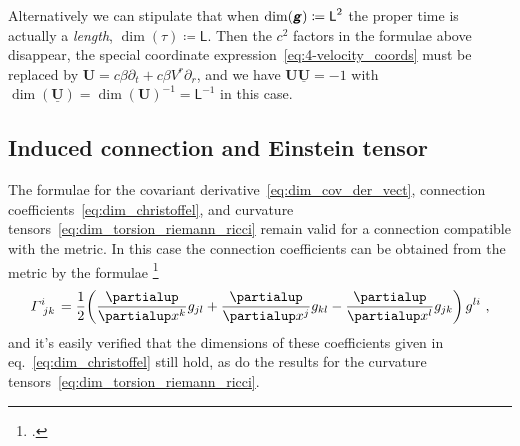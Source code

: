 \documentclass[\ifafour a4paper,12pt,\else a5paper,10pt,\fi%
onecolumn,oneside,article,%
british%
]{memoir}
\theoremstyle{remark}
\theoremstyle{innote}
\newcommand*{\mathte}[1]{\textbf{\textit{\textsf{#1}}}}
\newcommand*{\citep}{\footcites}
\newcommand*{\de}{\partialup}%
\newcommand*{\defd}{\coloneqq}
\renewcommand*{\|}[1][]{\nonscript\,#1\vert\nonscript\;\mathopen{}}
\newcommand*{\sect}{\S}%
\newcommand*{\eqn}{eq.}%
\newcommand*{\Un}{\textsf{1}}
\newcommand*{\Le}{\textsf{L}}
\newcommand*{\Ti}{\textsf{T}}
\newcommand*{\yg}{\mathte{g}}
\renewcommand*{\i}{\indices}
\newcommand*{\dex}[1][i]{\frac{\de}{\de x^{#1}}}
\newcommand*{\yGa}{\varGamma}
\newcommand*{\yU}{\bm{U}}
\newcommand*{\yUu}{\underline{\yU}}
\newcommand*{\ytp}{\tau}
\newcommand*{\yl}{\beta}
\begin{document}
\medskip

Alternatively we can stipulate that when $\dim(\yg) \defd \Le^{2}$ the
proper time is actually a \emph{length}, $\dim(\ytp) \defd \Le$. Then the $c^{2}$
factors in the formulae above disappear, the special coordinate
expression~\eqref{eq:4-velocity_coords} must be replaced by
$\yU = c\yl \de_{t} + c\yl V^{r} \de_{r}$, and we have $\yU\yUu = -1$ with
$\dim(\yUu) = \dim(\yU)^{-1} = \Le^{-1}$ in this case.








\subsection{Induced connection and Einstein tensor}
\label{sec:g_einst}


The formulae for the covariant derivative~\eqref{eq:dim_cov_der_vect},
connection coefficients~\eqref{eq:dim_christoffel}, and curvature
tensors~\eqref{eq:dim_torsion_riemann_ricci} remain valid for a connection
compatible with the metric. In this case the connection coefficients can be
obtained from the metric by the formulae
\citep[\sect~V.B.2]{choquetbruhatetal1977_r1996}
\begin{equation}
  \label{eq:christoffel_g}
  \yGa\i{^{i}_{jk}} = \frac{1}{2}
  \biggl(\dex[k]g_{jl} + \dex[j]g_{kl} - \dex[l]g_{jk}\biggr)\,g^{li} \ ,
\end{equation}
and it's easily verified that the dimensions of these coefficients given in
\eqn~\eqref{eq:dim_christoffel} still hold, as do the results for the
curvature tensors~\eqref{eq:dim_torsion_riemann_ricci}.
\end{document}
